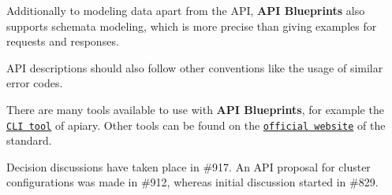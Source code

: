 Additionally to modeling data apart from the A\+PI, {\bfseries A\+PI Blueprints} also supports schemata modeling, which is more precise than giving examples for requests and responses.


\begin{DoxyItemize}
\item A\+PI descriptions should also follow other conventions like the usage of similar error codes.
\end{DoxyItemize}

There are many tools available to use with {\bfseries A\+PI Blueprints}, for example the \href{https://github.com/apiaryio/apiary-client}{\tt C\+LI tool} of apiary. Other tools can be found on the \href{https://apiblueprint.org/tools.html}{\tt official website} of the standard.

Decision discussions have taken place in \#917. An A\+PI proposal for cluster configurations was made in \#912, whereas initial discussion started in \#829. 